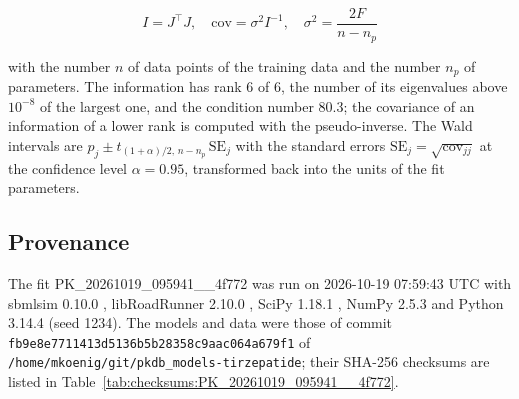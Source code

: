\documentclass{article}
\begin{document}
\begin{equation}
I = J^\top J, \quad \mathrm{cov} = \sigma^2 I^{-1}, \quad \sigma^2 = \frac{2 F}{n - n_p}
\end{equation}

with the number $n$ of data points of the training data and the number $n_p$ of parameters. The information has rank 6 of 6, the number of its eigenvalues above $10^{-8}$ of the largest one, and the condition number 80.3; the covariance of an information of a lower rank is computed with the pseudo-inverse. The Wald intervals are $\hat{p}_j \pm t_{(1+\alpha)/2,\, n-n_p}\, \mathrm{SE}_j$ with the standard errors $\mathrm{SE}_j = \sqrt{\mathrm{cov}_{jj}}$ at the confidence level $\alpha = 0.95$, transformed back into the units of the fit parameters.

\subsection{Provenance}

The fit PK\_20261019\_095941\_\_4f772 was run on 2026-10-19 07:59:43 UTC with sbmlsim 0.10.0 \cite{Koenig2026_sbmlsim}, libRoadRunner 2.10.0 \cite{Welsh2023}, SciPy 1.18.1 \cite{Virtanen2020}, NumPy 2.5.3 \cite{Harris2020} and Python 3.14.4 (seed 1234). The models and data were those of commit \texttt{fb9e8e7711413d5136b5b28358c9aac064a679f1} of \texttt{/home/mkoenig/git/pkdb\_models-tirzepatide}; their SHA-256 checksums are listed in Table~\ref{tab:checksums:PK_20261019_095941__4f772}.
\end{document}
